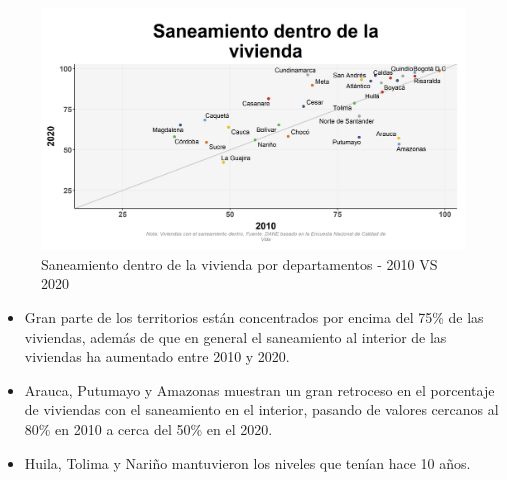     \begin{figure}[H]
        \caption{Saneamiento dentro de la vivienda por departamentos - 2010 VS 2020 \label{map_result_2} }
        \begin{center}
        \includegraphics[width=\textwidth,keepaspectratio]{img/var_193_scatter_time.png}
        \end{center}
    \end{figure}
            \begin{itemize}
                    \item Gran parte de los territorios están concentrados por encima del 75\% de las viviendas, además de que en general el saneamiento al interior de las viviendas ha aumentado entre 2010 y 2020.
                    \item Arauca, Putumayo y Amazonas muestran un gran retroceso en el porcentaje de viviendas con el saneamiento en el interior, pasando de valores cercanos al 80\% en 2010 a cerca del 50\% en el 2020.
                    \item Huila, Tolima y Nariño mantuvieron los niveles que tenían hace 10 años.
                    \end{itemize}

